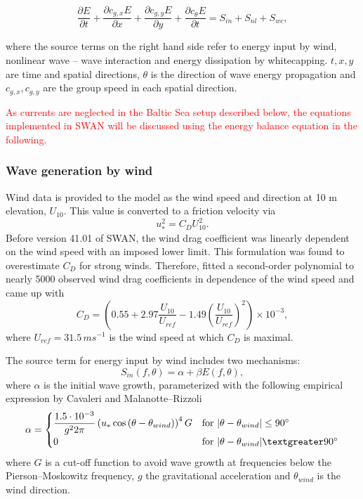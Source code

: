 \begin{equation}
 \frac{\partial E}{\partial t} + \frac{\partial c_{g,x} E}{\partial x} + \frac{ \partial c_{g,y} E}{\partial y} + \frac{\partial c_{\theta} E}{\partial t} = S_{in} + S_{nl} + S_{wc},
\end{equation}

where the source terms on the right hand side refer to energy input by wind, nonlinear wave -- wave interaction and energy dissipation by whitecapping. $t, x ,y$ are time and spatial directions, $\theta$ is the direction of wave energy propagation and $c_{g,x}, c_{g,y}$ are the group speed in each spatial direction. 

\textcolor{red}{As currents are neglected in the Baltic Sea setup described below, the equations implemented in SWAN will be discussed using the energy balance equation in the following. }

\subsubsection{Wave generation by wind}

Wind data is provided to the model as the wind speed and direction at 10 m elevation, $U_{10}$. This value is converted to a friction velocity via
\begin{equation}
 u_\ast^2 = C_D U_{10}^2.
\end{equation}
Before version 41.01 of SWAN, the wind drag coefficient was linearly dependent on the wind speed with an imposed lower limit. This formulation was found to overestimate $C_D$ for strong winds. Therefore, \cite{zijlema2012} fitted a second-order polynomial to nearly 5000 observed wind drag coefficients in dependence of the wind speed and came up with 
\begin{equation}
 C_D = \left( 0.55 + 2.97 \dfrac{U_{10}}{U_{ref}} - 1.49 \left( \dfrac{U_{10}}{U_{ref}} \right)^2 \right) \times 10^{-3} ,
\end{equation}
where $U_{ref} = 31.5 \, ms^{-1}$ is the wind speed at which $C_D$ is maximal.

The source term for energy input by wind includes two mechanisms:
\begin{equation}
 S_{in} (f, \theta) = \alpha + \beta E(f,\theta),
\end{equation}
where $\alpha$ is the initial wave growth, parameterized with the following empirical expression by Cavaleri and Malanotte--Rizzoli
\begin{equation}
 \alpha = 
 \begin{cases}
  \dfrac{1.5 \cdot 10^{-3}}{g^2 2 \pi} \left(u_\ast \cos{(\theta - \theta_{wind})}\right)^4 G & \text{for } |\theta - \theta_{wind}| \le 90^\circ  \\
  0 & \text{for } |\theta - \theta_{wind}| \textgreater 90^\circ  \\
 \end{cases}
\end{equation}
where $G$ is a cut-off function to avoid wave growth at frequencies below the Pierson--Moskowitz frequency, $g$ the gravitational acceleration and $\theta_{wind}$ is the wind direction. 

